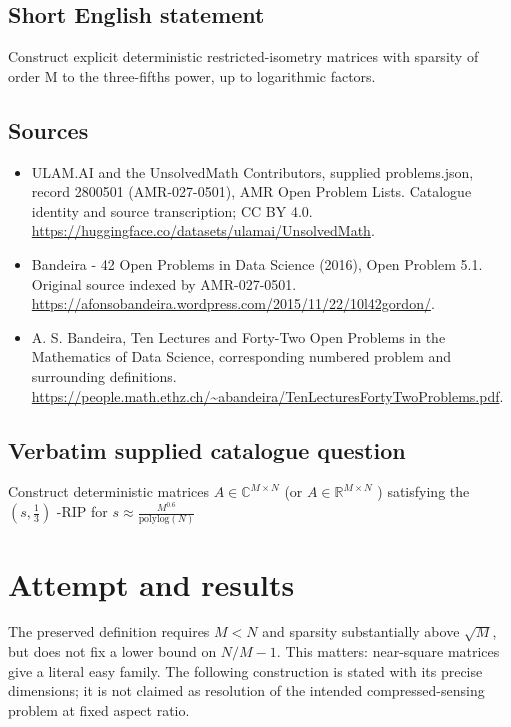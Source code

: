 \documentclass[11pt]{article}
\begin{document}
\subsection{Short English statement}
Construct explicit deterministic restricted-isometry matrices with sparsity of order M to the three-fifths power, up to logarithmic factors.
\subsection{Sources}
\begin{itemize}
\item[S1] ULAM.AI and the UnsolvedMath Contributors, supplied problems.json, record 2800501 (AMR-027-0501), AMR Open Problem Lists. Catalogue identity and source transcription; CC BY 4.0.
\url{https://huggingface.co/datasets/ulamai/UnsolvedMath}.
\item[S2] Bandeira - 42 Open Problems in Data Science (2016), Open Problem 5.1. Original source indexed by AMR-027-0501.
\url{https://afonsobandeira.wordpress.com/2015/11/22/10l42gordon/}.
\item[S3] A. S. Bandeira, Ten Lectures and Forty-Two Open Problems in the Mathematics of Data Science, corresponding numbered problem and surrounding definitions.
\url{https://people.math.ethz.ch/~abandeira/TenLecturesFortyTwoProblems.pdf}.
\end{itemize}
\subsection{Verbatim supplied catalogue question}
Construct deterministic matrices $A\in\mathbb{C}^{M\times N}$ (or $A\in\mathbb{R}^{M\times N}$ ) satisfying the $(s,\frac13)$ -RIP for $s\approx\frac{M^{0.6}}{\mathrm{polylog}(N)}$

\section{Attempt and results}
The preserved definition requires $M<N$ and sparsity substantially above
$\sqrt M$, but does not fix a lower bound on $N/M-1$. This matters:
near-square matrices give a literal easy family. The following construction
is stated with its precise dimensions; it is not claimed as resolution of
the intended compressed-sensing problem at fixed aspect ratio.
\end{document}

